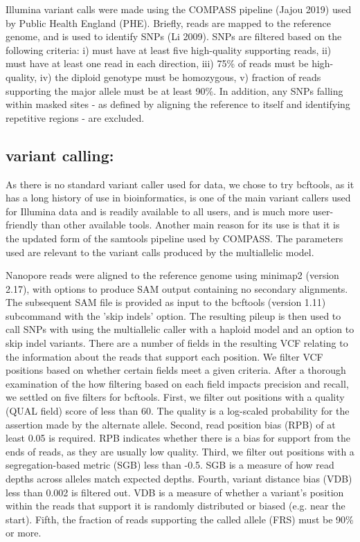 Illumina variant calls were made using the COMPASS pipeline (Jajou 2019) used by Public Health England (PHE). Briefly, reads are mapped to the \mtb{} reference genome, and  is used to identify SNPs (Li 2009). SNPs are filtered based on the following criteria: i) must have at least five high-quality supporting reads, ii) must have at least one read in each direction, iii) 75\% of reads must be high-quality, iv) the diploid genotype must be homozygous, v) fraction of reads supporting the major allele must be at least 90\%. In addition, any SNPs falling within masked sites - as defined by aligning the \mtb{} reference to itself and identifying repetitive regions - are excluded.

\subsection{\ont{} variant calling: }
\label{sec:bcftools-filters}

As there is no standard variant caller used for \mtb{} \ont{} data, we chose to try bcftools, as it has a long history of use in bioinformatics, is one of the main variant callers used for Illumina data  and is readily available to all users, and is much more user-friendly than other available tools. Another main reason for its use is that it is the updated form of the samtools pipeline used by COMPASS. The parameters used are
relevant to the variant calls produced by the multiallelic
model.

Nanopore reads were aligned to the \mtb{} reference genome using minimap2 (version 2.17), with options to produce SAM output containing no secondary alignments. The subsequent SAM file is provided as input to the bcftools (version 1.11) subcommand  with the 'skip indels' option. The resulting pileup is then used to call SNPs with  using the multiallelic caller with a haploid model and an option to skip indel variants.
There are a number of fields in the resulting VCF relating to the information about the reads that support each position. We filter VCF positions based on whether certain fields meet a given criteria.
After a thorough examination of the how filtering based on each field impacts precision and recall, we settled on five filters for bcftools. First, we filter out positions with a quality (QUAL field) score of less than 60. The quality is a log-scaled probability for the assertion made by the alternate allele. Second, read position bias (RPB) of at least 0.05 is required. RPB indicates whether there is a bias for support from the ends of reads, as they are usually low quality. Third, we filter out positions with a segregation-based metric (SGB) less than -0.5. SGB is a measure of how read depths across alleles match expected depths. Fourth, variant distance bias (VDB) less than 0.002 is filtered out. VDB is a measure of whether a variant's position within the reads that support it is randomly distributed or biased (e.g. near the start). Fifth, the fraction of reads supporting the called allele (FRS) must be 90\% or more.

